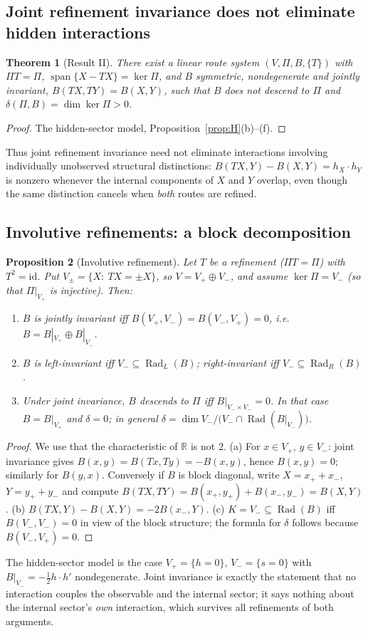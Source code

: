 \documentclass[11pt,a4paper]{article}
\newcommand{\RR}{\mathbb{R}}
\newcommand{\Rad}{\operatorname{Rad}}
\newcommand{\spn}{\operatorname{span}}
\newcommand{\id}{\mathrm{id}}
\newcommand{\defic}{\delta}
\theoremstyle{plain}
\newtheorem{theorem}{Theorem}[section]
\newtheorem{proposition}[theorem]{Proposition}
\theoremstyle{definition}
\begin{document}
\subsection{Joint refinement invariance does not eliminate hidden interactions}\label{sec:joint}
\begin{theorem}[Result II]\label{thm:joint}
There exist a linear route system $(V,\Pi,B,\{T\})$ with $\Pi T=\Pi$, $\spn\{X-TX\}=\ker\Pi$, and $B$ symmetric, nondegenerate and jointly invariant, $B(TX,TY)=B(X,Y)$, such that $B$ does not descend to $\Pi$ and $\defic(\Pi,B)=\dim\ker\Pi>0$.
\end{theorem}
\begin{proof}
The hidden-sector model, Proposition~\ref{prop:H}(b)--(f).
\end{proof}
Thus joint refinement invariance need not eliminate interactions involving individually unobserved structural distinctions: $B(TX,Y)-B(X,Y)=h_X\!\cdot h_Y$ is nonzero whenever the internal components of $X$ and $Y$ overlap, even though the same distinction cancels when \emph{both} routes are refined.

\subsection{Involutive refinements: a block decomposition}\label{sec:invol}
\begin{proposition}[Involutive refinement]\label{prop:invol}
Let $T$ be a refinement ($\Pi T=\Pi$) with $T^2=\id$. Put $V_\pm=\{X:\ TX=\pm X\}$, so $V=V_+\oplus V_-$, and assume $\ker\Pi=V_-$ (so that $\Pi|_{V_+}$ is injective). Then:
\begin{enumerate}[label=(\alph*)]
\item $B$ is jointly invariant iff $B(V_+,V_-)=B(V_-,V_+)=0$, i.e.\ $B=B|_{V_+}\oplus B|_{V_-}$.
\item $B$ is left-invariant iff $V_-\subseteq\Rad_L(B)$; right-invariant iff $V_-\subseteq\Rad_R(B)$.
\item Under joint invariance, $B$ descends to $\Pi$ iff $B|_{V_-\times V_-}=0$. In that case $B=B|_{V_+}$ and $\defic=0$; in general $\defic=\dim V_-/\bigl(V_-\cap\Rad(B|_{V_-})\bigr)$.
\end{enumerate}
\end{proposition}
\begin{proof}
We use that the characteristic of $\RR$ is not $2$. (a) For $x\in V_+$, $y\in V_-$: joint invariance gives $B(x,y)=B(Tx,Ty)=-B(x,y)$, hence $B(x,y)=0$; similarly for $B(y,x)$. Conversely if $B$ is block diagonal, write $X=x_++x_-$, $Y=y_++y_-$ and compute $B(TX,TY)=B(x_+,y_+)+B(x_-,y_-)=B(X,Y)$.
(b) $B(TX,Y)-B(X,Y)=-2B(x_-,Y)$.
(c) $K=V_-\subseteq\Rad(B)$ iff $B(V_-,V_-)=0$ in view of the block structure; the formula for $\defic$ follows because $B(V_-,V_+)=0$.
\end{proof}
The hidden-sector model is the case $V_+=\{h=0\}$, $V_-=\{s=0\}$ with $B|_{V_-}=-\tfrac12h\!\cdot h'$ nondegenerate. Joint invariance is exactly the statement that no interaction couples the observable and the internal sector; it says nothing about the internal sector's \emph{own} interaction, which survives all refinements of both arguments.
\end{document}
